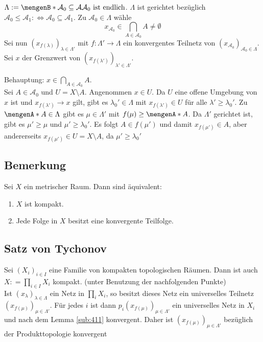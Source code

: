\begin{description}
	$\Lambda := \set[\mathcal{A}_0 \subseteq \mathcal{A}  ]{\mathcal{A}_0 \text{ ist endlich} } $. $\Lambda$ ist gerichtet bezüglich 
	$\mathcal{A}_0 \le \mathcal{A}_1  :\Leftrightarrow \mathcal{A}_0 \subseteq \mathcal{A}_1 $. Zu $\mathcal{A}_0 \in \Lambda $ wähle 
	\[
		x_{\mathcal{A}_0 } \in \bigcap_{A \in \mathcal{A}_0 } A \not= \emptyset
	\]
	Sei nun $(x_{f(\lambda )})_{\lambda  \in \Lambda'}$ mit $f : \Lambda' \to \Lambda$ ein konvergentes Teilnetz von $(x_{\mathcal{A}_0 })_{\mathcal{A}_0 \in \Lambda}$.
	Sei $x$ der Grenzwert von $(x_{f(\lambda')})_{\lambda'  \in \Lambda'}$. 
	
	Behauptung: $x \in \bigcap_{A \in \mathcal{A}_0 } A$. \\
	Sei $A \in \mathcal{A}_0 $ und $U = X \setminus A$. Angenommen $x \in U$. Da $U$ eine offene Umgebung von $x$ ist und $x_{f(\lambda')} \to x$ gilt, gibt es 
	$\lambda_0' \in \Lambda$ mit $x_{f(\lambda')} \in U$ für alle $\lambda' \ge \lambda_0'$. Zu $\set{A} \in \Lambda$ gibt es $\mu \in \Lambda'$ mit $f(\mu) \ge \set{A}$. Da
	$\Lambda '$ gerichtet ist, gibt es $\mu' \ge \mu$ und $\mu' \ge \lambda_0'$. Es folgt $A \in f(\mu')$ und damit $x_{f(\mu')} \in A$, aber andererseits 
	$x_{f(\mu')} \in U  = X \setminus A$, da $\mu' \ge \lambda_0'$ \light \bewende
	
\end{description}

\subsection[Bemerkung zu Kompaktheit in metrischen Räumen]{Bemerkung} %
\label{sub:46}
Sei $X$ ein metrischer Raum. Dann sind äquivalent:
	\begin{enumerate}[1)]
		\item $X$ ist kompakt.
		\item Jede Folge in $X$ besitzt eine konvergente Teilfolge.
	\end{enumerate}

\subsection{Satz von Tychonov} %
\label{sub:47}
Sei $(X_i)_{i \in I}$ eine Familie von kompakten topologischen Räumen. Dann ist auch $X : = \prod_{i \in I} X_i$ kompakt.
(unter Benutzung der nachfolgenden Punkte)\\
Ist $(x_\lambda )_{\lambda  \in \Lambda}$ ein Netz in $\prod_i X_i$, so besitzt dieses Netz ein universelles Teilnetz $(x_{f(\mu)})_{\mu \in \Lambda'}$.
Für jedes $i$ ist dann $p_i(x_{f(\mu)})_{\mu \in \Lambda'}$ ein universelles Netz in $X_i$ und nach dem Lemma \ref{sub:411} konvergent.
Daher ist $(x_{f(\mu)})_{\mu \in \Lambda'}$ bezüglich der Produkttopologie konvergent


